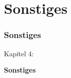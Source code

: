 %

\section{Sonstiges}
\begin{frame}[fragile]
	\frametitle{Sonstiges}

	\begin{center}\huge{Kapitel 4:}\end{center}
	\begin{center}\huge{\color{typo3darkgrey}\textbf{Sonstiges}}\end{center}

\end{frame}

